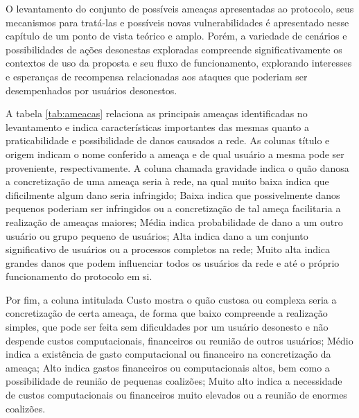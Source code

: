 O levantamento do conjunto de possíveis ameaças apresentadas ao protocolo, seus mecanismos para tratá-las e possíveis novas vulnerabilidades é apresentado nesse capítulo de um ponto de vista teórico e amplo. Porém, a variedade de cenários e possibilidades de ações desonestas exploradas compreende significativamente os contextos de uso da proposta e seu fluxo de funcionamento, explorando interesses e esperanças de recompensa relacionadas aos ataques que poderiam ser desempenhados por usuários desonestos.

%
A tabela \ref{tab:ameacas} relaciona as principais ameaças identificadas no levantamento e indica características importantes das mesmas quanto a praticabilidade e possibilidade de danos causados a rede. As colunas título e origem indicam o nome conferido a ameaça e de qual usuário a mesma pode ser proveniente, respectivamente. A coluna chamada gravidade indica o quão danosa a concretização de uma ameaça seria à rede, na qual muito baixa indica que dificilmente algum dano seria infringido; 
%
Baixa indica que possivelmente danos pequenos poderiam ser infringidos ou a concretização de tal ameça facilitaria a realização de ameaças maiores; 
%
Média indica probabilidade de dano a um outro usuário ou grupo pequeno de usuários; 
%
Alta indica dano a um conjunto significativo de usuários ou a processos completos na rede; 
%
Muito alta indica grandes danos que podem influenciar todos os usuários da rede e até o próprio funcionamento do protocolo em si.

%
Por fim, a coluna intitulada Custo mostra o quão custosa ou complexa seria a concretização de certa ameaça, de forma que baixo compreende a realização simples, que pode ser feita sem dificuldades por um usuário desonesto e não despende custos computacionais, financeiros ou reunião de outros usuários;
%
Médio indica a existência de gasto computacional ou financeiro na concretização da ameaça; 
%
Alto indica gastos financeiros ou computacionais altos, bem como a possibilidade de reunião de pequenas coalizões; 
%
Muito alto indica a necessidade de custos computacionais ou financeiros muito elevados ou a reunião de enormes coalizões.

